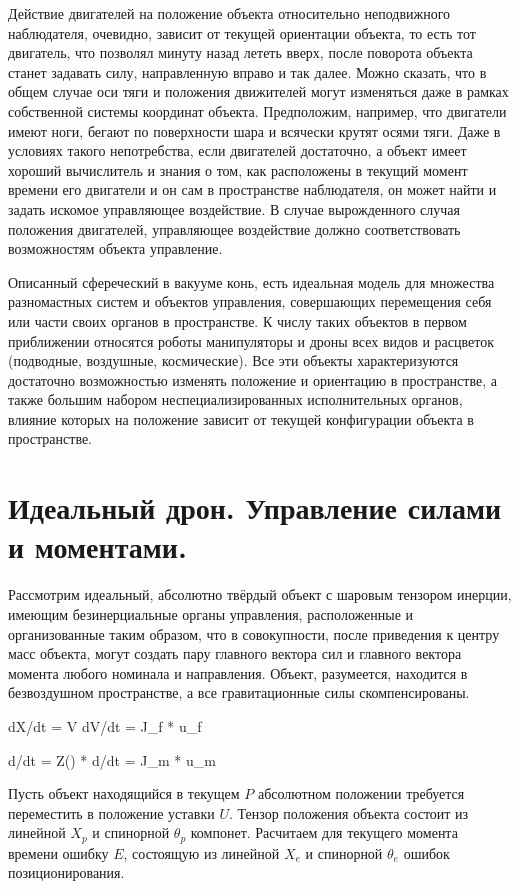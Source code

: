 \documentclass[a4paper]{article}
\begin{document}
Действие двигателей на положение объекта относительно неподвижного наблюдателя, очевидно, зависит от текущей ориентации объекта, то есть тот двигатель, что позволял минуту назад лететь вверх, после поворота объекта станет задавать силу, направленную вправо и так далее. Можно сказать, что в общем случае оси тяги и положения движителей могут изменяться даже в рамках собственной системы координат объекта. Предположим, например, что двигатели имеют ноги, бегают по поверхности шара и всячески крутят осями тяги. Даже в условиях такого непотребства, если двигателей достаточно, а объект имеет хороший вычислитель и знания о том, как расположены в текущий момент времени его двигатели и он сам в пространстве наблюдателя, он может найти и задать искомое управляющее воздействие. В случае вырожденного случая положения двигателей, управляющее воздействие должно соответствовать возможностям объекта управление.

Описанный сфереческий в вакууме конь, есть идеальная модель для множества разномастных систем и объектов управления, совершающих перемещения себя или части своих органов в пространстве. К числу таких объектов в первом приближении относятся роботы манипуляторы и дроны всех видов и расцветок (подводные, воздушные, космические). Все эти объекты характеризуются достаточно возможностью изменять положение и ориентацию в пространстве, а также большим набором неспециализированных исполнительных органов, влияние которых на положение зависит от текущей конфигурации объекта в пространстве.

\section{Идеальный дрон. Управление силами и моментами.}
Рассмотрим идеальный, абсолютно твёрдый объект с шаровым тензором инерции, имеющим безинерциальные органы управления, расположенные и организованные таким образом, что в совокупности, после приведения к центру масс объекта, могут создать пару главного вектора сил и главного вектора момента любого номинала и направления. Объект, разумеется, находится в безвоздушном пространстве, а все гравитационные силы скомпенсированы.

dX/dt = V
dV/dt = J_f * u_f

d\theta/dt = Z(\theta) * \omega
d\omega/dt = J_m * u_m

Пусть объект находящийся в текущем $P$ абсолютном положении требуется переместить в положение уставки $U$.
Тензор положения объекта состоит из линейной $X_p$ и спинорной $\theta_p$ компонет. Расчитаем для текущего момента времени ошибку $E$, состоящую из линейной $X_e$ и спинорной $\theta_e$ ошибок позиционирования.
\end{document}
